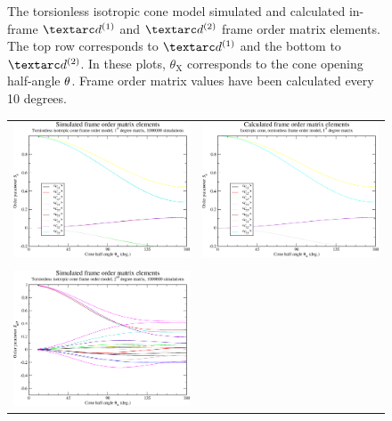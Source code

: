 \begin{figure}
\begin{tabular}{@{}cc@{}}
  \end{tabular}
  \caption[Torsionless isotropic cone simulated and calculated in-frame Daeg$^{(1)}$ and Daeg$^{(2)}$ elements.]{
    The torsionless isotropic cone model simulated and calculated in-frame $\FOone$ and $\FOtwo$ frame order matrix elements.
    The top row corresponds to $\FOone$ and the bottom to $\FOtwo$.
    In these plots, $\theta_\textrm{X}$ corresponds to the cone opening half-angle $\theta$.
    Frame order matrix values have been calculated every 10 degrees.
  }
  \label{fig: simulated and calculated in-frame 1st and 2nd degree iso cone, torsionless frame order}
\end{figure}

\begin{figure}
\centering
  \begin{tabular}{@{}cc@{}}
    \includegraphics[width=.5\textwidth]{images/frame_order_matrix/Sij_iso_cone_torsionless_out_of_frame_theta_x_ens1000000.eps} &
    \includegraphics[width=.5\textwidth]{images/frame_order_matrix/Sij_iso_cone_torsionless_out_of_frame_theta_x_calc.eps} \\
    \\[-5pt]
    \includegraphics[width=.5\textwidth]{images/frame_order_matrix/Sijkl_iso_cone_torsionless_out_of_frame_theta_x_ens1000000.eps} &

\end{tabular}
\end{figure}

